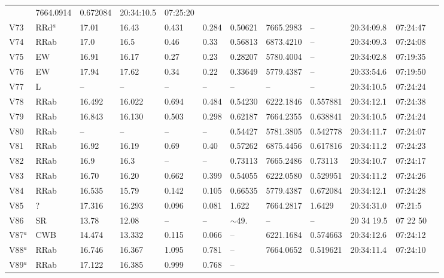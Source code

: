 \documentclass[journal]{rmaa}
\newcommand{\1}{\'{\i}}
\begin{document}
\begin{table*}
\begin{center}
\begin{tabular}{llllllllllll}
       & 7664.0914    & 0.672084  & 20:34:10.5 &  07:25:20\\
V73       & RRd$^{a}$     & 17.01   &16.43 & 0.431  &0.284  & 0.50621
       &  7665.2983    &--   &20:34:09.8  & 07:24:47\\
V74      & RRab    & 17.0  & 16.5 & 0.46&0.33   & 0.56813
       & 6873.4210    & --   & 20:34:09.3 &  07:24:08\\
V75       & EW   &16.91   & 16.17 & 0.27 & 0.23  & 0.28207
        &5780.4004   &--   & 20:34:02.8  & 07:19:35\\
V76       & EW    & 17.94  &  17.62 &0.34 &0.22  &  0.33649
       & 5779.4387   &-- & 20:33:54.6 &  07:19:50\\
V77       & L     & --   &--  & --  & --  & --
       & --    &--  &20:34:10.5 &  07:24:24\\
V78      & RRab    & 16.492  & 16.022 & 0.694 & 0.484  &  0.54230
       & 6222.1846    & 0.557881  & 20:34:12.1 &  07:24:38\\
V79       & RRab     & 16.843  &16.130 & 0.503  & 0.298  & 0.62187
       &7664.2355     &0.638841   &20:34:10.5  & 07:24:24\\
V80      & RRab    & --  & -- & -- & --   & 0.54427
       & 5781.3805   &  0.542778 & 20:34:11.7 &  07:24:07\\
V81       & RRab   &16.92  & 16.19 &0.69 &0.40  & 0.57262
        & 6875.4456   &0.617816 & 20:34:11.2  & 07:24:23\\
V82       & RRab    & 16.9& 16.3 &--   & -- & 0.73113
       & 7665.2486     &0.73113 & 20:34:10.7 &  07:24:17\\
V83       & RRab     & 16.70   &16.20 & 0.662  & 0.399  & 0.54055
       & 6222.0580   &0.529951   &20:34:11.2 &  07:24:26\\
V84      & RRab    &16.535  &15.79 & 0.142 &0.105 & 0.66535
       & 5779.4387    & 0.672084  & 20:34:12.1 &  07:24:28\\
V85       & ?     & 17.316  &16.293  &0.096 &0.081 & 1.622
       & 7664.2817  &1.6429   &20:34:31.0 &  07:21:5\\
V86      & SR    &13.78  &12.08 & -- &--  & $\sim$49.
       & --    & --  & 20 34 19.5 &07 22 50\\
V87$^{a}$      & CWB   & 14.474  & 13.332 & 0.115 &0.066 & --
       & 6221.1684    & 0.574663 & 20:34:12.6 & 07:24:12\\
V88$^{a}$       & RRab     & 16.746  &16.367 &1.095 &0.781  & --
       & 7664.0652   &0.519621   &20:34:11.4 & 07:24:10\\
V89$^{a}$      & RRab   & 17.122  & 16.385 & 0.999 &0.768  & --

\end{tabular}
\end{center}
\end{table*}
\end{document}
